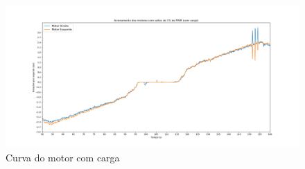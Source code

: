 \begin{figure}[!ht]
\centering
\caption{Curva do motor com carga}
		\centering
		\includegraphics[trim={5cm 1cm 5cm 2cm},clip,
scale=0.25]{Figuras/Acionamento_Com_Carga_rps}
\end{figure}